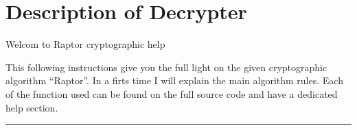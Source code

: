 \documentclass[letterpaper,10pt,english]{sphinxmanual}
\begin{document}
\newpage
\section{Description of De\sphinxhyphen{}crypter}
\label{\detokenize{Description of Crypterv3.1:description-of-de-crypter}}\label{\detokenize{Description of Crypterv3.1::doc}}
\sphinxAtStartPar
Welcom to Raptor cryptographic help

\sphinxAtStartPar
This following instructions give you the full light on the given cryptographic algorithm “Raptor”.
In a firts time I will explain the main algorithm rules. Each of the function used can be found on the
full source code and have a dedicated help section.

\sphinxAtStartPar
{}


\bigskip\hrule\bigskip
\end{document}

